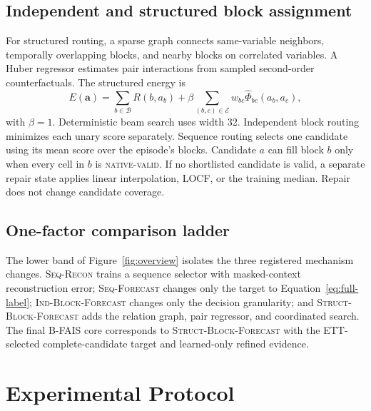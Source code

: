 \documentclass{article}
\newcommand{\bfais}{\textsc{B-FAIS}\xspace}
\newcommand{\native}{\textsc{native-valid}\xspace}
\newcommand{\segrecon}{\textsc{Seq-Recon}\xspace}
\newcommand{\segforecast}{\textsc{Seq-Forecast}\xspace}
\newcommand{\indblock}{\textsc{Ind-Block-Forecast}\xspace}
\newcommand{\strblock}{\textsc{Struct-Block-Forecast}\xspace}
\begin{document}
\subsection{Independent and structured block assignment}

For structured routing, a sparse graph connects same-variable neighbors, temporally overlapping blocks, and nearby blocks on correlated variables. A Huber regressor estimates pair interactions from sampled second-order counterfactuals. The structured energy is
\begin{equation}
 E(\mathbf a)=\sum_{b\in\mathcal B}R(b,a_b)
 +\beta\sum_{(b,c)\in\mathcal E}w_{bc}\widehat\Phi_{bc}(a_b,a_c),
 \label{eq:energy}
\end{equation}
with $\beta=1$. Deterministic beam search uses width 32. Independent block routing minimizes each unary score separately. Sequence routing selects one candidate using its mean score over the episode's blocks. Candidate $a$ can fill block $b$ only when every cell in $b$ is \native. If no shortlisted candidate is valid, a separate repair state applies linear interpolation, LOCF, or the training median. Repair does not change candidate coverage.

\subsection{One-factor comparison ladder}

The lower band of Figure~\ref{fig:overview} isolates the three registered mechanism changes. \segrecon trains a sequence selector with masked-context reconstruction error; \segforecast changes only the target to Equation~\ref{eq:full-label}; \indblock changes only the decision granularity; and \strblock adds the relation graph, pair regressor, and coordinated search. The final \bfais core corresponds to \strblock with the ETT-selected complete-candidate target and learned-only refined evidence.

\section{Experimental Protocol}
\label{sec:experiments}
\end{document}
